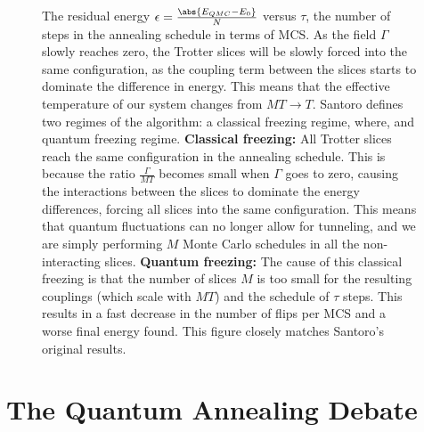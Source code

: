 \clearpage
\begin{figure}[htb!]
    \centering
    \caption{The residual energy $\epsilon = \frac{\abs{E_{QMC} - E_{0}}}{N}$ versus $\tau$, the number of steps in the annealing schedule in terms of MCS. As the field $\Gamma$ slowly reaches zero, the Trotter slices will be slowly forced into the same configuration, as the coupling term between the slices starts to dominate the difference in energy. This means that the effective temperature of our system changes from $MT \rightarrow T$. Santoro \cite{Santoro2002} defines two regimes of the algorithm: a classical freezing regime, where, and quantum freezing regime. \textbf{Classical freezing:} All Trotter slices reach the same configuration in the annealing schedule. This is because the ratio $\frac{\Gamma}{MT}$ becomes small when $\Gamma$ goes to zero, causing the interactions between the slices to dominate the energy differences, forcing all slices into the same configuration. This means that quantum fluctuations can no longer allow for tunneling, and we are simply performing $M$ Monte Carlo schedules in all the non-interacting slices. \textbf{Quantum freezing:} The cause of this classical freezing is that the number of slices $M$ is too small for the resulting couplings (which scale with $MT$) and the schedule of $\tau$ steps. This results in a fast decrease in the number of flips per MCS and a worse final energy found. This figure closely matches Santoro's original results.}
    \label{fig:santoro}
\end{figure}

\section{The Quantum Annealing Debate\label{sec:qa_debate}}

